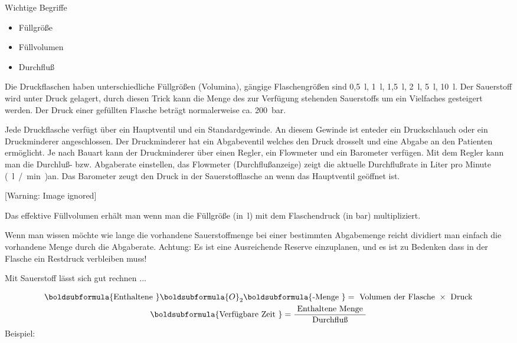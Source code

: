 \documentclass{article}
\begin{document}
Wichtige Begriffe

\begin{itemize}
\item F\"ullgr\"o{\ss}e 

\item F\"ullvolumen 

\item Durchflu{\ss} 

\end{itemize}
Die Druckflaschen haben unterschiedliche F\"ullgr\"o{\ss}en (Volumina),
g\"angige Flaschengr\"o{\ss}en sind 0,5~l, 1~l, 1,5~l, 2~l, 5~l, 10~l.
Der Sauerstoff wird unter Druck gelagert, durch diesen Trick kann die
Menge des zur Verf\"ugung stehenden Sauerstoffs um ein Vielfaches
gesteigert werden. Der Druck einer gef\"ullten Flasche betr\"agt
normalerweise ca. 200~bar. 

Jede Druckflasche verf\"ugt \"uber ein Hauptventil und ein
Standardgewinde. An diesem Gewinde ist enteder ein Druckschlauch oder
ein Druckminderer angeschlossen. Der  Druckminderer hat ein
Abgabeventil welches den Druck drosselt und eine Abgabe an den
Patienten erm\"oglicht. Je nach Bauart kann der Druckminderer \"uber
einen Regler, ein Flowmeter und ein Barometer verf\"ugen. Mit dem
Regler kann man die Durchlu{\ss}- bzw. Abgaberate ein\-stellen, das
Flowmeter (Durchflu{\ss}anzeige) zeigt die aktuelle Durchflu{\ss}rate
in Liter pro Minute (~l~/~min~)an. Das Barometer zeugt den Druck in der
Sauerstofflasche an wenn das Haupt\-ventil ge\"offnet ist. 

\begin{center}
 [Warning: Image ignored] %

\end{center}
Das effektive F\"ullvolumen erh\"alt man wenn man die F\"ullgr\"o{\ss}e
(in~l) mit dem Flaschendruck (in bar) multipliziert.  

Wenn man wissen m\"ochte wie lange die vorhandene Sauerstoffmenge bei
einer bestimmten Abgabemenge reicht dividiert man einfach die
vorhandene Menge durch die Abgaberate. Achtung: Es ist eine
Ausreichende Reserve einzuplanen, und es ist zu Bedenken dass in der
Flasche ein Restdruck verbleiben muss! 

Mit Sauerstoff l\"asst sich gut rechnen ...

\[\begin{gathered}\boldsubformula{\text{Enthaltene
}}\boldsubformula{O}_{2}\boldsubformula{\text{{}-Menge }}=\text{
Volumen der Flasche }\times \text{
Druck}\\\boldsubformula{\text{Verf\"ugbare Zeit }}=\frac{\text{
Enthaltene Menge }}{\text{ Durchflu{\ss} }}\end{gathered}\]
Beispiel:
\end{document}
